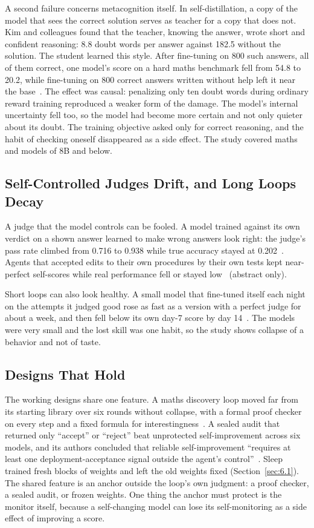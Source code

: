 \documentclass[journal]{IEEEtran}
\begin{document}
A second failure concerns metacognition itself. In self-distillation, a copy of the model that sees the correct solution serves as teacher for a copy that does not. Kim and colleagues found that the teacher, knowing the answer, wrote short and confident reasoning: 8.8 doubt words per answer against 182.5 without the solution. The student learned this style. After fine-tuning on 800 such answers, all of them correct, one model's score on a hard maths benchmark fell from 54.8 to 20.2, while fine-tuning on 800 correct answers written without help left it near the base~\cite{Kim2026}. The effect was causal: penalizing only ten doubt words during ordinary reward training reproduced a weaker form of the damage. The model's internal uncertainty fell too, so the model had become more certain and not only quieter about its doubt. The training objective asked only for correct reasoning, and the habit of checking oneself disappeared as a side effect. The study covered maths and models of 8B and below.

\subsection{Self-Controlled Judges Drift, and Long Loops Decay}\label{sec:7.3}

A judge that the model controls can be fooled. A model trained against its own verdict on a shown answer learned to make wrong answers look right: the judge's pass rate climbed from 0.716 to 0.938 while true accuracy stayed at 0.202~\cite{Zhou2026}. Agents that accepted edits to their own procedures by their own tests kept near-perfect self-scores while real performance fell or stayed low~\cite{Guo2026} (abstract only).

Short loops can also look healthy. A small model that fine-tuned itself each night on the attempts it judged good rose as fast as a version with a perfect judge for about a week, and then fell below its own day-7 score by day 14~\cite{Kongsilp2026}. The models were very small and the lost skill was one habit, so the study shows collapse of a behavior and not of taste.

\subsection{Designs That Hold}\label{sec:7.4}

The working designs share one feature. A maths discovery loop moved far from its starting library over six rounds without collapse, with a formal proof checker on every step and a fixed formula for interestingness~\cite{Patel2026}. A sealed audit that returned only ``accept'' or ``reject'' beat unprotected self-improvement across six models, and its authors concluded that reliable self-improvement ``requires at least one deployment-acceptance signal outside the agent's control''~\cite{Guo2026}. Sleep trained fresh blocks of weights and left the old weights fixed (Section~\ref{sec:6.1}). The shared feature is an anchor outside the loop's own judgment: a proof checker, a sealed audit, or frozen weights. One thing the anchor must protect is the monitor itself, because a self-changing model can lose its self-monitoring as a side effect of improving a score.
\end{document}
